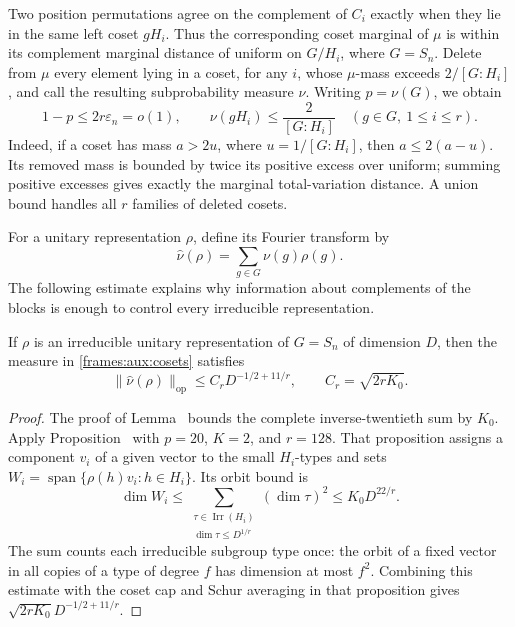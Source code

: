 Two position permutations agree on the complement of $C_i$ exactly
when they lie in the same left coset $gH_i$.  Thus the corresponding
coset marginal of $\mu$ is within its complement marginal distance
of uniform on $G/H_i$, where $G=S_n$.  Delete from $\mu$ every
element lying in a coset, for any $i$, whose $\mu$-mass exceeds
$2/[G:H_i]$, and call the resulting subprobability measure $\nu$.
Writing $p=\nu(G)$, we obtain
\begin{equation}\label{frames:aux:cosets}
 1-p\le2r\varepsilon_n=o(1),\qquad
 \nu(gH_i)\le\frac2{[G:H_i]}\quad(g\in G,\ 1\le i\le r).
\end{equation}
Indeed, if a coset has mass $a>2u$, where $u=1/[G:H_i]$, then
$a\le2(a-u)$.  Its removed mass is bounded by twice its positive
excess over uniform; summing positive excesses gives exactly the
marginal total-variation distance.  A union bound handles all $r$
families of deleted cosets.

For a unitary representation $\rho$, define its Fourier transform by
\[
 \widehat\nu(\rho)=\sum_{g\in G}\nu(g)\rho(g).
\]
The following estimate explains why information about complements
of the blocks is enough to control every irreducible representation.

\begin{lemma}\label{frames:aux:orbit-lift}
If $\rho$ is an irreducible unitary representation of $G=S_n$ of
dimension $D$, then the measure in \eqref{frames:aux:cosets} satisfies
\begin{equation}\label{frames:aux:operator-bound}
 \|\widehat\nu(\rho)\|_{\mathrm{op}}
 \le C_rD^{-1/2+11/r},\qquad C_r=\sqrt{2rK_0}.
\end{equation}
\end{lemma}

\begin{proof}
The proof of Lemma~ bounds the complete
inverse-twentieth sum by $K_0$. Apply Proposition~
with $p=20$, $K=2$, and $r=128$. That proposition assigns a component
$v_i$ of a given vector to the small $H_i$-types and sets
$W_i=\operatorname{span}\{\rho(h)v_i:h\in H_i\}$. Its orbit bound is
\begin{equation}\label{frames:aux:orbit-dimension}
 \dim W_i
 \le\sum_{\substack{\tau\in\operatorname{Irr}(H_i)\\
                         \dim\tau\le D^{1/r}}}(\dim\tau)^2
 \le K_0D^{22/r}.
\end{equation}
The sum counts each irreducible subgroup type once: the orbit of a
fixed vector in all copies of a type of degree $f$ has dimension at
most $f^2$. Combining this estimate with the coset cap and Schur
averaging in that proposition gives
$\sqrt{2rK_0}D^{-1/2+11/r}$.
\end{proof}

